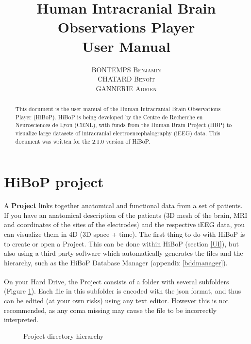 \documentclass[a4paper]{article}
\title{Human Intracranial Brain Observations Player \\ User Manual}
\author{\textsc{BONTEMPS Benjamin} \\ \textsc{CHATARD Benoît} \\ \textsc{GANNERIE Adrien}}
\begin{document}
\maketitle
\begin{abstract}
This document is the user manual of the Human Intracranial Brain Observations Player (HiBoP). HiBoP is being developed by the Centre de Recherche en Neurosciences de Lyon (CRNL), with funds from the Human Brain Project (HBP) to visualize large datasets of intracranial electroencephalography (iEEG) data. This document was written for the 2.1.0 version of HiBoP.
\end{abstract}
\tableofcontents
\section{HiBoP project} \label{data}
\paragraph{} A \textbf{Project} links together anatomical and functional data from a set of patients. If you have an anatomical description of the patients (3D mesh of the brain, MRI and coordinates of the sites of the electrodes) and the respective iEEG data, you can visualize them in 4D (3D space + time). The first thing to do with HiBoP is to create or open a Project. This can be done within HiBoP (section \ref{UI}), but also using a third-party software which automatically generates the files and the hierarchy, such as the HiBoP Database Manager (appendix \ref{bddmanager}).
\paragraph{} On your Hard Drive, the Project consists of a folder with several subfolders (Figure \ref{projectDirectory}). Each file in this subfolder is encoded with the json format, and thus can be edited (at your own risks) using any text editor. However this is not recommended, as any coma missing may cause the file to be incorrectly interpreted.
\begin{figure}[H]
\caption{\label{projectDirectory}Project directory hierarchy}
\end{figure}
\end{document}
